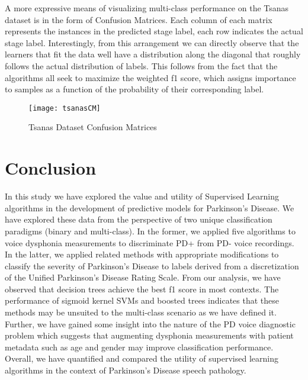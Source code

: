 \documentclass[12pt]{article}
\begin{document}
A more expressive means of visualizing multi-class performance on the Tsanas dataset is in the form of Confusion Matrices. Each column of each matrix represents the instances in the predicted stage label, each row indicates the actual stage label. Interestingly, from this arrangement we can directly observe that the learners that fit the data well have a distribution along the diagonal that roughly follows the actual distribution of labels. This follows from the fact that the algorithms all seek to maximize the weighted f1 score, which assigns importance to samples as a function of the probability of their corresponding label.

\begin{figure}
    \centering
    \texttt{[image: tsanasCM]}
    \caption{Tsanas Dataset Confusion Matrices}
\end{figure}

\section{Conclusion}
\label{sec:conc}
In this study we have explored the value and utility of Supervised Learning algorithms in the development of predictive models for Parkinson's Disease. We have explored these data from the perspective of two unique classification paradigms (binary and multi-class). In the former, we applied five algorithms to voice dysphonia measurements to discriminate PD+ from PD- voice recordings. In the latter, we applied related methods with appropriate modifications to classify the severity of Parkinson's Disease to labels derived from a discretization of the Unified Parkinson's Disease Rating Scale. From our analysis, we have observed that decision trees achieve the best f1 score in most contexts. The performance of sigmoid kernel SVMs and boosted trees indicates that these methods may be unsuited to the multi-class scenario as we have defined it. Further, we have gained some insight into the nature of the PD voice diagnostic problem which suggests that augmenting dysphonia measurements with patient metadata such as age and gender may improve classification performance. Overall, we have quantified and compared the utility of supervised learning algorithms in the context of Parkinson's Disease speech pathology.



\end{document}
